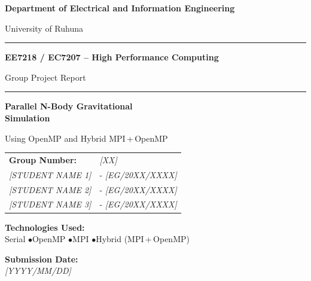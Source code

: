 \documentclass[11pt,a4paper]{article}
\begin{document}
\begin{titlepage}
\centering
\vspace*{1.5cm}

{\Large\bfseries Department of Electrical and Information Engineering\par}
\vspace{0.3cm}
{\large University of Ruhuna\par}

\vspace{1.2cm}
\rule{\textwidth}{0.8pt}
\vspace{0.3cm}

{\LARGE\bfseries EE7218 / EC7207 -- High Performance Computing\par}
\vspace{0.25cm}
{\large Group Project Report\par}

\vspace{0.3cm}
\rule{\textwidth}{0.8pt}

\vspace{1.5cm}
{\Huge\bfseries Parallel N-Body Gravitational\\[0.2cm] Simulation\par}
\vspace{0.5cm}
{\Large Using OpenMP and Hybrid MPI\,+\,OpenMP\par}

\vspace{1.8cm}
\begin{tabular}{ll}
\textbf{Group Number:} & \textit{[XX]} \\[0.4em]
\textit{[STUDENT NAME 1]} & - \textit{[EG/20XX/XXXX]} \\
\textit{[STUDENT NAME 2]} & - \textit{[EG/20XX/XXXX]} \\
\textit{[STUDENT NAME 3]} & - \textit{[EG/20XX/XXXX]} \\
\end{tabular}

\vspace{1.5cm}
{\bfseries Technologies Used:}\\[0.4em]
Serial \quad$\bullet$\quad OpenMP \quad$\bullet$\quad MPI \quad$\bullet$\quad Hybrid (MPI\,+\,OpenMP)

\vfill
{\bfseries Submission Date:}\\
\textit{[YYYY/MM/DD]}
\end{titlepage}
\end{document}
